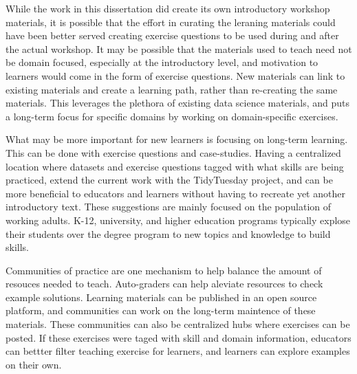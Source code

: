 \documentclass[doublespace,draft,nopageskip]{VTthesis} %
\begin{document}
        While the work in this dissertation did create its own introductory workshop materials,
        it is possible that the effort in curating the leraning materials could have been better served creating exercise questions
        to be used during and after the actual workshop.
        It may be possible that the materials used to teach need not be domain focused,
        especially at the introductory level,
        and motivation to learners would come in the form of exercise questions.
        New materials can link to existing materials and create a learning path,
        rather than re-creating the same materials.
        This leverages the plethora of existing data science materials,
        and puts a long-term focus for specific domains by working on domain-specific exercises.

        What may be more important for new learners is focusing on long-term learning.
        This can be done with exercise questions and case-studies.
        Having a centralized location where datasets and exercise questions tagged with what skills are being practiced,
        extend the current work with the TidyTuesday project,
        and can be more beneficial to educators and learners without having to recreate yet another
        introductory text.
        These suggestions are mainly focused on the population of working adults.
        K-12, university, and higher education programs typically explose their students
        over the degree program to new topics and knowledge to build skills.

        Communities of practice are one mechanism to help balance the amount of resouces needed to teach.
        Auto-graders can help aleviate resources to check example solutions.
        Learning materials can be published in an open source platform,
        and communities can work on the long-term maintence of these materials.
        These communities can also be centralized hubs where exercises can be posted.
        If these exercises were taged with skill and domain information,
        educators can bettter filter teaching exercise for learners,
        and learners can explore examples on their own.




	
	

	\appendix
\end{document}
